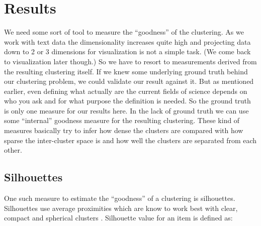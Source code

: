 \chapter{Results}
\label{chapter:results}

We need some sort of tool to measure the ``goodness'' of the 
clustering. As we work with text data the dimensionality increases 
quite high and projecting data down to 2 or 3 dimensions for 
visualization is not a simple task. (We come back to visualization 
later though.)
So we have to resort to measurements derived from the 
resulting clustering itself. If we knew some underlying ground 
truth behind our clustering problem, we could validate our result 
against it. But as mentioned earlier, even defining what actually 
are the current fields of science depends on who you ask and for 
what purpose the definition is needed. So the ground truth is only
one measure for our results here.
In the lack of ground truth we can use some ``internal'' goodness 
measure for the resulting clustering. These kind of measures 
basically try to infer how dense the clusters are compared with how 
sparse the inter-cluster space is and how well the clusters are 
separated from each other.


\section{Silhouettes}
One such measure to estimate the ``goodness'' of a clustering is 
silhouettes. Silhouettes use average proximities which are know 
to work best with clear, compact and spherical clusters 
\cite{rousseeuw_silhouettes:_1987}. Silhouette value for an item 
is defined as:

